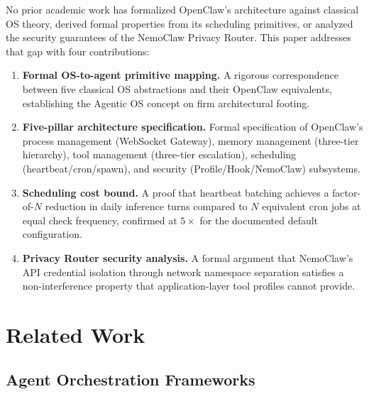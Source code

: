 \documentclass[journal]{IEEEtran}
\begin{document}
No prior academic work has formalized OpenClaw's architecture against classical
OS theory, derived formal properties from its scheduling primitives, or
analyzed the security guarantees of the NemoClaw Privacy Router. This paper
addresses that gap with four contributions:

\begin{enumerate}
\item \textbf{Formal OS-to-agent primitive mapping.} A rigorous correspondence
between five classical OS abstractions and their OpenClaw equivalents,
establishing the Agentic OS concept on firm architectural footing.

\item \textbf{Five-pillar architecture specification.} Formal specification of
OpenClaw's process management (WebSocket Gateway), memory management
(three-tier hierarchy), tool management (three-tier escalation), scheduling
(heartbeat/cron/spawn), and security (Profile/Hook/NemoClaw) subsystems.

\item \textbf{Scheduling cost bound.} A proof that heartbeat batching achieves
a factor-of-$N$ reduction in daily inference turns compared to $N$ equivalent
cron jobs at equal check frequency, confirmed at $5\times$ for the documented
default configuration.

\item \textbf{Privacy Router security analysis.} A formal argument that
NemoClaw's API credential isolation through network namespace separation
satisfies a non-interference property that application-layer tool profiles
cannot provide.
\end{enumerate}

\section{Related Work}

\subsection{Agent Orchestration Frameworks}
\end{document}
